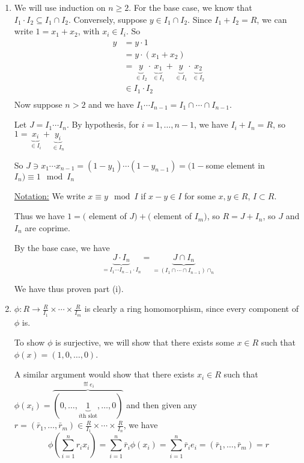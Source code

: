 \documentclass[x11names,reqno,14pt]{extarticle}
\begin{document}
\begin{enumerate}[label=(\roman*)]
\item We will use induction on $n \geq 2$. For the base case, we know that $I_1\cdot I_2 \subseteq I_1\cap I_2$. Conversely, suppose $y \in I_1 \cap I_2$. Since $I_1 + I_2 = R$, we can write $1 = x_1 + x_2$, with $x_i\in I_i$. So
\begin{align*}
y & = y \cdot 1 \\
  & = y \cdot(x_1 + x_2) \\
  & = \underbrace{y}_{\in I_2}\cdot\underbrace{x_1}_{\in I_1} + \underbrace{y}_{\in I_1}\cdot\underbrace{x_2}_{\in I_2} \\
  & \in I_1\cdot I_2 \\
\end{align*}
Now suppose $n > 2$ and we have $I_1\cdots I_{n - 1} = I_1 \cap \cdots \cap I_{n - 1}$. 

Let $J = I_1\cdots I_n$. By hypothesis, for $i =1, \dots, n - 1$, we have $I_i + I_n = R$, so $1 = \underbrace{x_i}_{\in I_i} + \underbrace{y_i}_{\in I_n}$

So $J \ni x_1\cdots x_{n - 1} = (1 - y_1)\cdots(1 - y_{n - 1}) = (1 - $some element in $I_n) \equiv 1 \mod I_n$

\underline{Notation:} We write $x \equiv y \mod I$ if $x - y \in I$ for some $x, y \in R$, $I \subset R$.

Thus we have $1 = ($ element of $J) + ($ element of $I_m)$, so $R = J + I_n$, so $J$ and $I_n$ are coprime. 

By the base case, we have 
\[
\underbrace{J\cdot I_n}_{= I_1\cdots I_{n - 1}\cdot I_n} = \underbrace{J\cap I_n}_{=(I_1 \cap \cdots \cap I_{n - 1})\cap _n}
\] 

We have thus proven part (i). 

\item $\phi:R\to \frac{R}{I_1}\times\cdots\times\frac{R}{I_m}$ is clearly a ring homomorphism, since every component of $\phi$ is. 

To show $\phi$ is surjective, we will show that there exists some $x \in R$ such that $\phi(x) = (1, 0,\dots, 0)$. 

A similar argument would show that there exists $x_i \in R$ such that $\phi(x_i) = \overbrace{(0, \dots, \underbrace{1}_{i\text{th slot}}, \dots, 0)}^{\eqdef e_i}$ and then given any $r = (\bar{r}_1, \dots, \bar{r}_m) \in \frac{R}{I_1}\times\cdots\times\frac{R}{I_n}$, we have
\[
\phi\left(\sum_{i=1}^nr_ix_i\right) = \sum_{i=1}^n\bar{r}_i\phi(x_i) = \sum_{i=1}^n\bar{r}_ie_i = (\bar{r}_1,\dots,\bar{r}_m) = r
\]


\end{enumerate}
\end{document}
